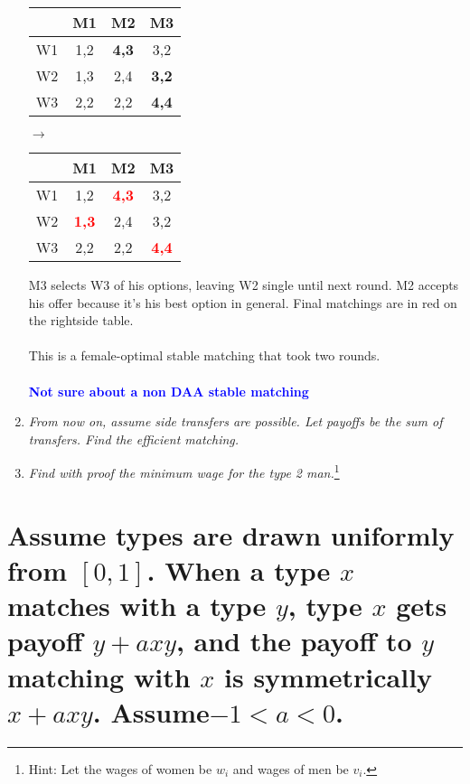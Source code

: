 \documentclass[]{article}
\newcommand{\fix} [1] {\textbf{\textcolor{blue}{#1}}} %
\begin{document}
\begin{enumerate}[label = (\alph*)]
\begin{center}
\begin{tabular}{|c|c|c|c|}
\hline 
               & M1 & M2 & M3 \\ 
\hline 
W1 & 1,2 & \textbf{4,3} & 3,2 \\ 
\hline 
W2 & 1,3 & 2,4 & \textbf{3,2} \\ 
\hline 
W3 & 2,2 & 2,2 & \textbf{4,4} \\ 
\hline 
\end{tabular} 
$\longrightarrow$
\begin{tabular}{|c|c|c|c|}
\hline 
               & M1 & M2 & M3 \\ 
\hline 
W1 & 1,2 & \textbf{\textcolor{red}{4,3}} & 3,2 \\ 
\hline 
W2 & \textbf{\textcolor{red}{1,3}} & 2,4 & 3,2 \\ 
\hline 
W3 & 2,2 & 2,2 & \textbf{\textcolor{red}{4,4}} \\ 
\hline 
\end{tabular} 
\end{center}
M3 selects W3 of his options, leaving W2 single until next round. M2 accepts his offer because it's his best option in general. Final matchings are in red on the rightside table.\\
\\

This is a female-optimal stable matching that took two rounds. 
\\\\
\fix{Not sure about a non DAA stable matching}


\item \textit{From now on,  assume side transfers are possible.  Let payoffs be the sum of transfers.  Find the efficient matching.}


\item \textit{Find with proof the minimum wage for the type 2 man.}\footnote{Hint: Let the wages of women be $w_i$ and wages of men be $v_i$.}

\end{enumerate}



\section{Assume types are drawn uniformly from $[0,1]$.  When a type $x $ matches with a type $y$, type $x$ gets payoff $y+axy$, and the payoff to $y$ matching with $ x$ is symmetrically $x+axy$.  Assume$-1< a <0$.}
\end{document}

